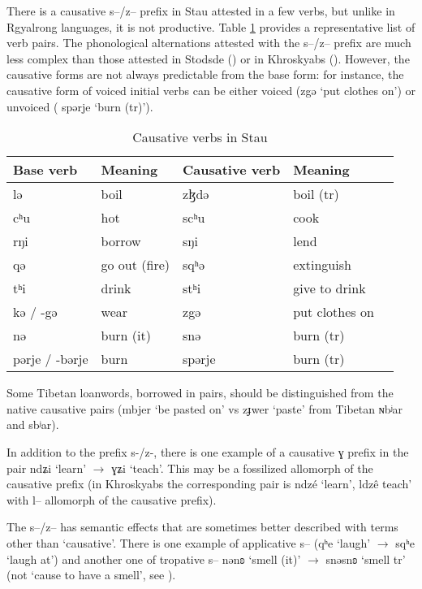 \documentclass[oneside,a4paper,11pt]{article}
\newcommand{\ipa}[1]{{\phon #1}} %
\begin{document}
There is a causative \ipa{s--/z--} prefix in Stau attested in a few verbs, but unlike in Rgyalrong languages, it is not productive. Table \ref{tab:causative} provides a representative list of verb pairs. The phonological alternations attested with the \ipa{s--/z--} prefix are much less complex than those attested in Stodsde (\citealt{jackson07shangzhai}) or in Khroskyabs (\citealt{lai14caus}). However, the causative forms are not always predictable from the base form: for instance, the causative form of voiced initial verbs can be either voiced (\ipa{zgə} `put clothes on') or unvoiced ( \ipa{spərje} `burn (tr)').
 
 
   \begin{table}[H]
 \caption{Causative verbs in Stau} \label{tab:causative} \centering 
\begin{tabular}{lllll}
\toprule
Base verb & Meaning & Causative verb & Meaning \\
\midrule
 \ipa{lə}  &boil& \ipa{zɮdə}& boil (tr)\\
  \ipa{cʰu}  & hot &  \ipa{scʰu}& cook \\
    \ipa{rŋi}  & borrow &  \ipa{sŋi}& lend \\
    \ipa{qə}  & go out (fire) &  \ipa{sqʰə}& extinguish\\
    \ipa{tʰi}  & drink &  \ipa{stʰi} & give to drink\\
    \ipa{kə} / \ipa{-gə} & wear &  \ipa{zgə} & put clothes on \\
     \ipa{nə}  & burn (it) &  \ipa{snə}& burn (tr)\\
     \ipa{pərje} / \ipa{-bərje} & burn &  \ipa{spərje} & burn (tr)\\
 \bottomrule
\end{tabular}
\end{table}

Some Tibetan  loanwords, borrowed in pairs, should be distinguished from the native causative pairs (\ipa{mbjer} `be pasted on' vs \ipa{zɟwer}  `paste' from Tibetan \ipa{ɴbʲar} and \ipa{sbʲar}).
 
 
 In addition to the prefix \ipa{s-/z-}, there is one example of a causative \ipa{ɣ} prefix in the pair   \ipa{ndʑi} `learn'    $\rightarrow$  \ipa{ɣʑi} `teach'. This may be a fossilized allomorph of the causative prefix (in Khroskyabs the corresponding pair is \ipa{ndzé} `learn', \ipa{ldzê}  teach' with \ipa{l--} allomorph of the causative prefix).
     
The \ipa{s--/z--} has semantic effects that are sometimes better described with terms other than `causative'. There is one example of applicative \ipa{s--} (\ipa{qʰe}  `laugh' $\rightarrow$ \ipa{sqʰe} `laugh at') and another one of tropative \ipa{s--}  \ipa{nənʚ}  `smell (it)' $\rightarrow$ \ipa{snəsnʚ} `smell tr' (not `cause to have a smell', see \citealt{jacques13tropative}).
 
\end{document}
